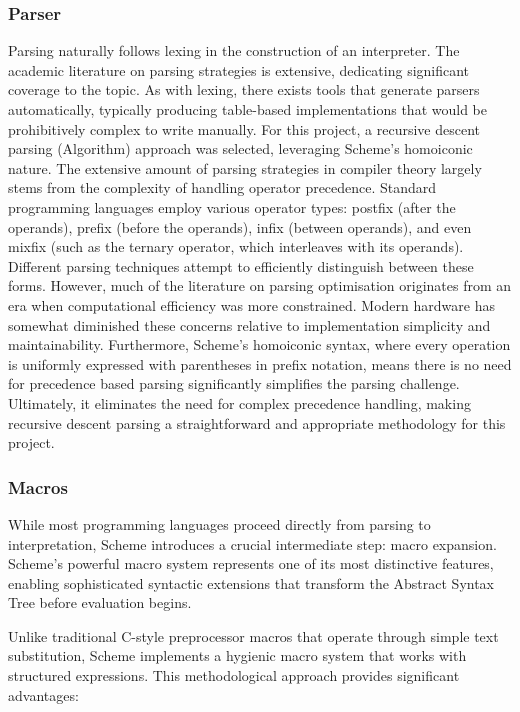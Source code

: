 \documentclass[final]{cmpreport_02}
\begin{document}
\subsubsection{Parser}
Parsing naturally follows lexing in the construction of an interpreter. The academic literature on parsing strategies is extensive, \cite{aho2006compilers} dedicating significant coverage to the topic. 
As with lexing, there exists tools that generate parsers automatically, typically producing table-based implementations that would be prohibitively complex to write manually. For this project, a recursive descent parsing (Algorithm) approach was selected, leveraging Scheme's homoiconic nature.
The extensive amount of parsing strategies in compiler theory largely stems from the complexity of handling operator precedence. Standard programming languages employ various operator types: postfix (after the operands), prefix (before the operands), infix (between operands), and even mixfix (such as the ternary operator, which interleaves with its operands). Different parsing techniques attempt to efficiently distinguish between these forms.
However, much of the literature on parsing optimisation originates from an era when computational efficiency was more constrained. Modern hardware has somewhat diminished these concerns relative to implementation simplicity and maintainability.
Furthermore, Scheme's homoiconic syntax, where every operation is uniformly expressed with parentheses in prefix notation, means there is no need for precedence based parsing significantly simplifies the parsing challenge. Ultimately, it eliminates the need for complex precedence handling, making recursive descent parsing a straightforward and appropriate methodology for this project.

\subsubsection{Macros}
While most programming languages proceed directly from parsing to interpretation, Scheme introduces a crucial intermediate step: macro expansion. Scheme's powerful macro system represents one of its most distinctive features, enabling sophisticated syntactic extensions that transform the Abstract Syntax Tree before evaluation begins.

Unlike traditional C-style preprocessor macros that operate through simple text substitution, Scheme implements a hygienic macro system that works with structured expressions. This methodological approach provides significant advantages:
\end{document}
